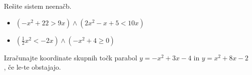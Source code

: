 \begin{naloga}
    Rešite sistem neenačb.
    \begin{itemize}
        \item $(-x^2+22>9x)\land(2x^2-x+5<10x)$
        \item $(\frac{1}{2}x^2<-2x)\land(-x^2+4\geq 0)$
    \end{itemize}
\end{naloga}

\begin{naloga}
    Izračunajte koordinate skupnih točk parabol $y=-x^2+3x-4$ in $y=x^2+8x-2$, če le-te obstajajo.
\end{naloga}